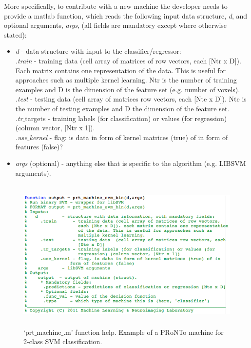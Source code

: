 More specifically, to contribute with a new machine the developer needs to provide a matlab function, which reads the following input data structure, \textit{d}, and optional arguments, \textit{args}, (all fields are mandatory except where otherwise stated):

\begin{itemize}
\item \textit{d} - data structure with input to the classifier/regressor: \\
     \textit{.train} - training data (cell array of matrices of row vectors, each [Ntr x D]). Each matrix contains one representation of the data. This is useful for approaches such as multiple kernel learning. Ntr is the number of training examples and D is the dimension of the feature set (e.g. number of voxels).\\
     \textit{.test} - testing data  (cell array of matrices row vectors, each [Nte x D]). Nte is the number of testing examples and D the dimension of the feature set.\\
     \textit{.tr}$\_$targets - training labels (for classification) or values (for regression) (column vector, [Ntr x 1]).\\
     \textit{.use$\_$kernel} - flag: is data in form of kernel matrices (true) of in form of features (false)?
\item    \textit{args} (optional) - anything else that is specific to the algorithm (e.g. LIBSVM arguments).
\end{itemize}


\begin{figure}[!htbp]
  \begin{center}
      \includegraphics[height=3.0in]{images/prtmachinesvmbin.png}
   \caption{`prt$\_$machine$\_$.m' function help. Example of a PRoNTo machine for 2-class SVM classification.}
    \label{Fig1.3}
  \end{center}
\end{figure}

